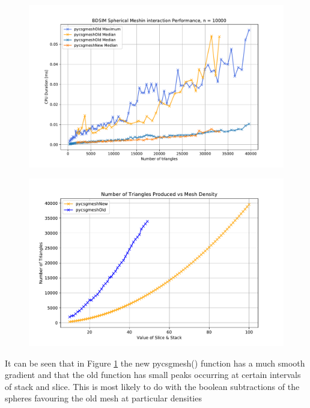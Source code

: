 \documentclass[12pt,a4paper]{article}
\begin{document}
\begin{figure}[h!]
\centering
\begin{minipage}{.5\textwidth}
  \centering
  \includegraphics[height=0.7\linewidth]{Images//CPU//mednmax.pdf}
  \label{mednmax}
\end{minipage}%
\begin{minipage}{.5\textwidth}
  \centering
  \includegraphics[height=0.7\linewidth]{Images//Triangles//MeshvTRi1.pdf}
  \label{tritri}
\end{minipage}%
\end{figure}

\noindent It can be seen that in Figure \ref{tritri} the new pycsgmesh() function has a much smooth gradient and that the old function has small peaks occurring at certain intervals of stack and slice. This is most likely to do with the boolean subtractions of the spheres favouring the old mesh at particular densities
\end{document}
